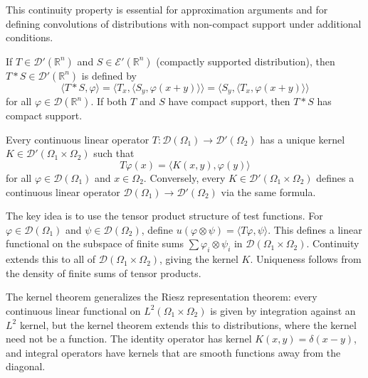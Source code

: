 This continuity property is essential for approximation arguments and for defining convolutions of distributions with non-compact support under additional conditions.

\begin{theorem}\label{thm:convolution}
If $T \in \mathcal{D}'(\mathbb{R}^n)$ and $S \in \mathcal{E}'(\mathbb{R}^n)$ (compactly supported distribution), then $T * S \in \mathcal{D}'(\mathbb{R}^n)$ is defined by
\[\langle T * S, \varphi \rangle = \langle T_x, \langle S_y, \varphi(x+y) \rangle \rangle = \langle S_y, \langle T_x, \varphi(x+y) \rangle \rangle\]
for all $\varphi \in \mathcal{D}(\mathbb{R}^n)$. If both $T$ and $S$ have compact support, then $T * S$ has compact support.
\end{theorem}

\begin{theorem}\label{thm:kernel}
Every continuous linear operator $T: \mathcal{D}(\Omega_1) \to \mathcal{D}'(\Omega_2)$ has a unique kernel $K \in \mathcal{D}'(\Omega_1 \times \Omega_2)$ such that
\[T\varphi(x) = \langle K(x,y), \varphi(y) \rangle\]
for all $\varphi \in \mathcal{D}(\Omega_1)$ and $x \in \Omega_2$. Conversely, every $K \in \mathcal{D}'(\Omega_1 \times \Omega_2)$ defines a continuous linear operator $\mathcal{D}(\Omega_1) \to \mathcal{D}'(\Omega_2)$ via the same formula.
\end{theorem}

\begin{remark}
The key idea is to use the tensor product structure of test functions. For $\varphi \in \mathcal{D}(\Omega_1)$ and $\psi \in \mathcal{D}(\Omega_2)$, define $u(\varphi \otimes \psi) = \langle T\varphi, \psi \rangle$. This defines a linear functional on the subspace of finite sums $\sum \varphi_i \otimes \psi_i$ in $\mathcal{D}(\Omega_1 \times \Omega_2)$. Continuity extends this to all of $\mathcal{D}(\Omega_1 \times \Omega_2)$, giving the kernel $K$. Uniqueness follows from the density of finite sums of tensor products.
\end{remark}

The kernel theorem generalizes the Riesz representation theorem: every continuous linear functional on $L^2(\Omega_1 \times \Omega_2)$ is given by integration against an $L^2$ kernel, but the kernel theorem extends this to distributions, where the kernel need not be a function. The identity operator has kernel $K(x,y) = \delta(x-y)$, and integral operators have kernels that are smooth functions away from the diagonal.

